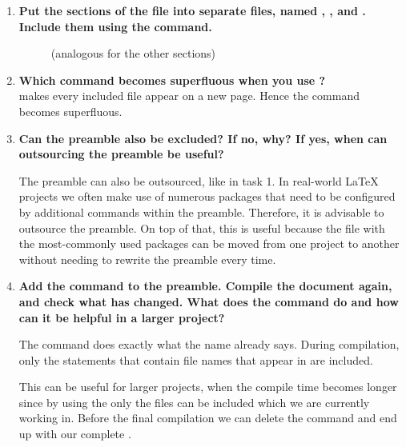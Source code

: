\begin{enumerate}
	\item 
	 \textbf{Put the sections of the file into separate files, named 
	 , , and . Include 
	 them using the   command.}
		
	\begin{figure}[H]
		\caption{}
	\end{figure}
	\begin{figure}[H]
		 \caption{ (analogous for the other 
			sections)}
	\end{figure}
 	\item \textbf{Which command becomes superfluous when you use 
	?} \\
	 makes every included file appear on a 
	new page. Hence the command  becomes 
	superfluous.
	
	\item \textbf{Can the preamble also be excluded? If no, why? If yes, when 
	can outsourcing the preamble be useful?} 

	 The preamble can also be outsourced, like in task 1. In real-world 
	 \LaTeX{} projects we often make use of numerous packages that need to be 
	 configured by additional commands within the preamble. Therefore, it is 
	 advisable to outsource the preamble. On top of that, this is useful 
	 because the file with the most-commonly used packages can be moved from 
	 one project to another without needing to rewrite the preamble every time.
	 
	\item 
	\textbf{Add the command  to the preamble. Compile the document again, and 
	check what has changed. What does the command do and how can it be helpful 
	in a larger project? }

	The command  does 
	exactly what the name already says. During compilation, only the 
	 statements that contain file names 
	that appear in  
	are included.
	
	This can be useful for larger projects, when the compile time becomes 
	longer since by using the  only the 
	files can be included which we are currently working in. Before the final 
	compilation we can delete the  
	command and end up with our complete .
\end{enumerate}